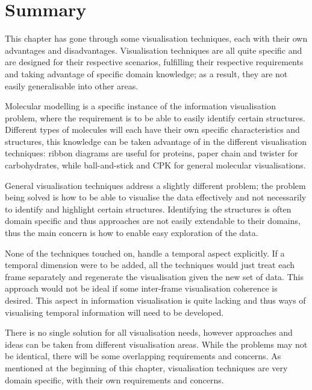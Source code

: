 

\section{Summary}
\label{sec:endbackground}

This chapter has gone through some visualisation techniques, each with their own
advantages and disadvantages. Visualisation techniques are all quite specific
and are designed for their respective scenarios, fulfilling their respective
requirements and taking advantage of specific domain knowledge; as a result,
they are not easily generalisable into other areas.

Molecular modelling is a specific instance of the information visualisation
problem, where the requirement is to be able to easily identify certain
structures. Different types of molecules will each have their own specific
characteristics and structures, this knowledge can be taken advantage of in the
different visualisation techniques: ribbon diagrams are useful for proteins,
paper chain and twister for carbohydrates, while ball-and-stick and CPK for
general molecular visualisations.

General visualisation techniques address a slightly different problem; the
problem being solved is how to be able to visualise the data effectively and
not necessarily to identify and highlight certain structures. Identifying the
structures is often domain specific and thus approaches are not easily
extendable to their domains, thus the main concern is how to enable easy
exploration of the data.

None of the techniques touched on, handle a temporal aspect explicitly. If a
temporal dimension were to be added, all the techniques would just treat each
frame separately and regenerate the visualisation given the new set of data.
This approach would not be ideal if some inter-frame visualisation coherence is
desired. This aspect in information visualisation is quite lacking and thus ways
of visualising temporal information will need to be developed.

There is no single solution for all visualisation needs, however approaches and
ideas can be taken from different visualisation areas. While the problems may
not be identical, there will be some overlapping requirements and concerns. As
mentioned at the beginning of this chapter, visualisation techniques are very
domain specific, with their own requirements and concerns.

